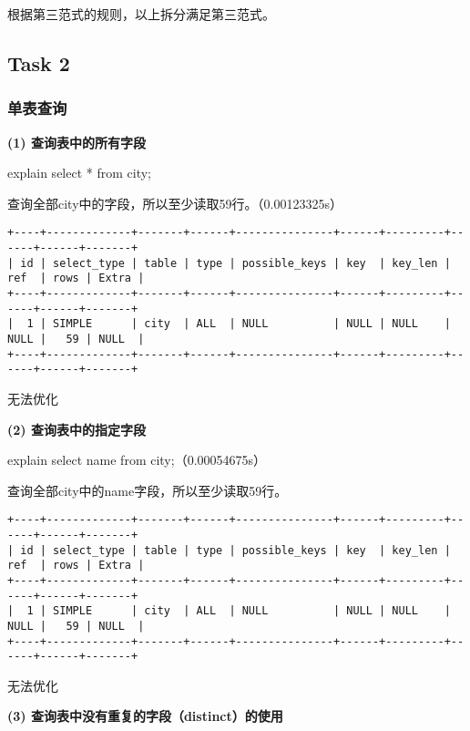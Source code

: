 \documentclass[a4paper, 11pt, nofonts, nocap, fancyhdr]{ctexart}
\begin{document}
根据第三范式的规则，以上拆分满足第三范式。

\subsection{Task 2}

\subsubsection{单表查询}

\textbf{(1) 查询表中的所有字段} 
      
explain select * from city;

查询全部city中的字段，所以至少读取59行。（0.00123325s）

\begin{verbatim}
+----+-------------+-------+------+---------------+------+---------+------+------+-------+
| id | select_type | table | type | possible_keys | key  | key_len | ref  | rows | Extra |
+----+-------------+-------+------+---------------+------+---------+------+------+-------+
|  1 | SIMPLE      | city  | ALL  | NULL          | NULL | NULL    | NULL |   59 | NULL  |
+----+-------------+-------+------+---------------+------+---------+------+------+-------+
\end{verbatim}

无法优化

\vspace{0.7cm}

\textbf{(2) 查询表中的指定字段} 

explain select name from city;（0.00054675s）

查询全部city中的name字段，所以至少读取59行。 

\begin{verbatim}
+----+-------------+-------+------+---------------+------+---------+------+------+-------+
| id | select_type | table | type | possible_keys | key  | key_len | ref  | rows | Extra |
+----+-------------+-------+------+---------------+------+---------+------+------+-------+
|  1 | SIMPLE      | city  | ALL  | NULL          | NULL | NULL    | NULL |   59 | NULL  |
+----+-------------+-------+------+---------------+------+---------+------+------+-------+
\end{verbatim}

无法优化

\vspace{0.7cm}

\textbf{(3) 查询表中没有重复的字段（distinct）的使用} 
\end{document}
